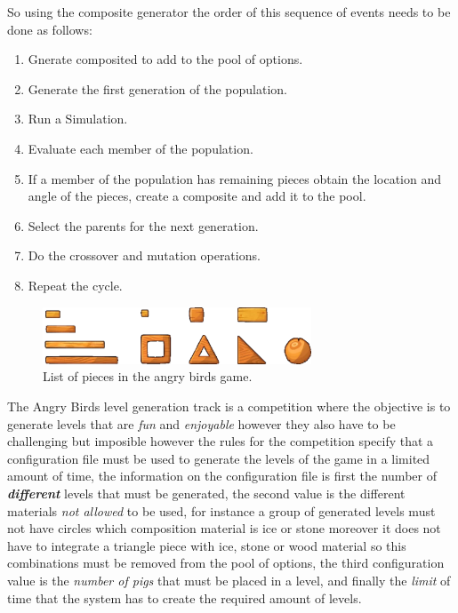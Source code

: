 \documentclass[conference]{IEEEtran}
\begin{document}
So using the composite generator the order of this sequence of
events needs to be done as follows:




\begin{enumerate}
\item Gnerate composited to add to the pool of options.
\item Generate the first generation of the population.
\item Run a Simulation.
\item Evaluate each member of the population.
\item If a member of the population has remaining pieces obtain the location and
angle of the pieces, create a composite and add it to the pool.
\item Select the parents for the next generation.
\item Do the crossover and mutation operations.
\item Repeat the cycle.
\end{enumerate}

\begin{figure}[htbp]
\centerline{\includegraphics[width=80mm]{Images/list_pieces.png}}
\caption{List of pieces in the angry birds game.}
\label{piece_list}
\end{figure}


The Angry Birds level generation track is a competition where the objective is 
to generate levels that are \textit{fun} and \textit{enjoyable} however they 
also have to be challenging but imposible however the rules for the competition 
specify that a configuration file must be used to
generate the levels of the game in a limited amount of time, the information on
the configuration file is first the number of \textbf{\textit{different}} levels
that must be generated, the second value is the different materials \textit{not
allowed} to be used, for instance a group of generated levels must not have
circles which composition material is ice or stone moreover it does not have to
integrate a triangle piece with ice, stone or wood material so this combinations
must be removed from the pool of options, the third configuration value is the
\textit{number of pigs} that must be placed in a level, and finally the
\textit{limit} of time that the system has to create the required amount of
levels.
\end{document}
